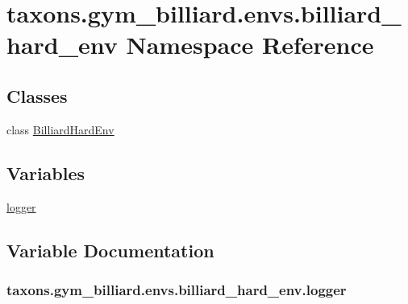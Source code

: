 \hypertarget{namespacetaxons_1_1gym__billiard_1_1envs_1_1billiard__hard__env}{}\section{taxons.\+gym\+\_\+billiard.\+envs.\+billiard\+\_\+hard\+\_\+env Namespace Reference}
\label{namespacetaxons_1_1gym__billiard_1_1envs_1_1billiard__hard__env}
\subsection*{Classes}
\begin{DoxyCompactItemize}
\item 
class \hyperlink{classtaxons_1_1gym__billiard_1_1envs_1_1billiard__hard__env_1_1_billiard_hard_env}{Billiard\+Hard\+Env}
\end{DoxyCompactItemize}
\subsection*{Variables}
\begin{DoxyCompactItemize}
\item 
\hyperlink{namespacetaxons_1_1gym__billiard_1_1envs_1_1billiard__hard__env_a324413b889aaac4da131e79663b1a26d}{logger}
\end{DoxyCompactItemize}


\subsection{Variable Documentation}
\subsubsection[{\texorpdfstring{logger}{logger}}]{\setlength{\rightskip}{0pt plus 5cm}taxons.\+gym\+\_\+billiard.\+envs.\+billiard\+\_\+hard\+\_\+env.\+logger}\hypertarget{namespacetaxons_1_1gym__billiard_1_1envs_1_1billiard__hard__env_a324413b889aaac4da131e79663b1a26d}{}\label{namespacetaxons_1_1gym__billiard_1_1envs_1_1billiard__hard__env_a324413b889aaac4da131e79663b1a26d}
